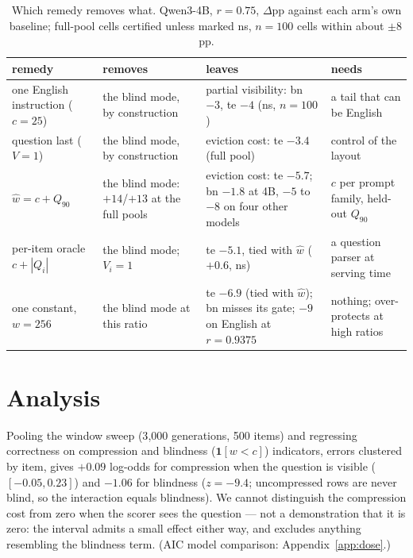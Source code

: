 \documentclass{article}
\begin{document}
\begin{table}[!h]
\caption{Which remedy removes what. Qwen3-4B, $r{=}0.75$, $\Delta$pp
against each arm's own baseline; full-pool cells certified unless marked
ns, $n{=}100$ cells within about $\pm 8$\,pp.}
\label{tab:fixes}
\centering
\footnotesize
\setlength{\tabcolsep}{4pt}
\begin{tabular}{@{}>{\raggedright\arraybackslash}p{2.7cm}>{\raggedright\arraybackslash}p{2.7cm}>{\raggedright\arraybackslash}p{4.5cm}>{\raggedright\arraybackslash}p{2.6cm}@{}}
\toprule
remedy & removes & leaves & needs \\
\midrule
one English instruction ($c{=}25$) & the blind mode, by construction &
partial visibility: bn $-3$, te $-4$ (ns, $n{=}100$) & a tail that can be
English \\
question last ($V{=}1$) & the blind mode, by construction & eviction
cost: te $-3.4$ (full pool) & control of the layout \\
$\hat w = c + Q_{90}$ & the blind mode: $+14$/$+13$ at the full pools &
eviction cost: te $-5.7$; bn $-1.8$ at 4B, $-5$ to $-8$ on four other
models & $c$ per prompt family, held-out $Q_{90}$ \\
per-item oracle $c{+}|Q_i|$ & the blind mode; $V_i{=}1$ & te $-5.1$,
tied with $\hat w$ ($+0.6$, ns) & a question parser at serving time \\
one constant, $w{=}256$ & the blind mode at this ratio & te $-6.9$ (tied
with $\hat w$); bn misses its gate; $-9$ on English at $r{=}0.9375$ &
nothing; over-protects at high ratios \\
\bottomrule
\end{tabular}
\end{table}

\section{Analysis}
\label{sec:analysis}

Pooling the window sweep (3{,}000 generations, 500 items) and
regressing correctness on compression and blindness
($\mathbf{1}[w<c]$) indicators, errors clustered by item, gives
$+0.09$ log-odds for compression when the question is visible
($[-0.05, 0.23]$) and $-1.06$ for blindness ($z{=}{-}9.4$;
uncompressed rows are never blind, so the interaction equals
blindness). We cannot distinguish the compression cost from
zero when the scorer sees the question --- not a demonstration that it
is zero: the interval admits a small effect either way, and excludes
anything resembling the blindness term. (AIC model comparison: Appendix~\ref{app:dose}.)
\end{document}
